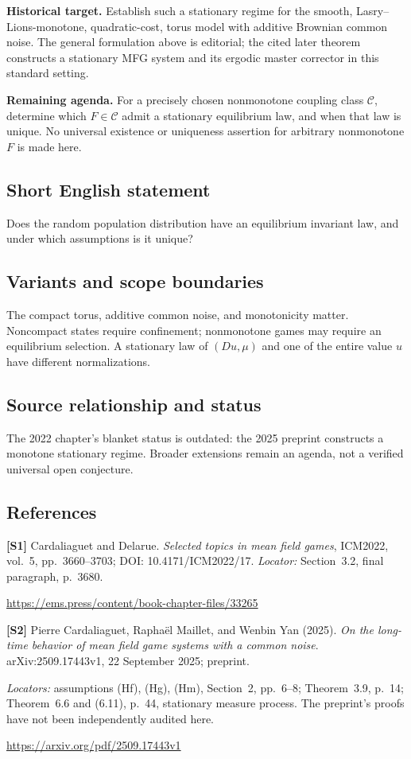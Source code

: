 \documentclass[11pt,a4paper]{article}
\begin{document}
\textbf{Historical target.} Establish such a stationary regime for the smooth, Lasry--Lions-monotone, quadratic-cost, torus model with additive Brownian common noise. The general formulation above is editorial; the cited later theorem constructs a stationary MFG system and its ergodic master corrector in this standard setting.

\textbf{Remaining agenda.} For a precisely chosen nonmonotone coupling class $\mathcal C$, determine which $F\in\mathcal C$ admit a stationary equilibrium law, and when that law is unique. No universal existence or uniqueness assertion for arbitrary nonmonotone $F$ is made here.
\subsection*{Short English statement}
Does the random population distribution have an equilibrium invariant law, and under which assumptions is it unique?
\subsection*{Variants and scope boundaries}
The compact torus, additive common noise, and monotonicity matter. Noncompact states require confinement; nonmonotone games may require an equilibrium selection. A stationary law of $(Du,\mu)$ and one of the entire value $u$ have different normalizations.
\subsection*{Source relationship and status}
The 2022 chapter's blanket status is outdated: the 2025 preprint constructs a monotone stationary regime. Broader extensions remain an agenda, not a verified universal open conjecture.
\subsection*{References}
\begingroup\footnotesize\raggedright
{\footnotesize\raggedright
\textbf{[S1]} Cardaliaguet and Delarue. \emph{Selected topics in mean field games}, ICM2022, vol.~5, pp.~3660--3703; DOI: 10.4171/ICM2022/17. \textit{Locator:} Section~3.2, final paragraph, p.~3680.\par
\url{https://ems.press/content/book-chapter-files/33265}\par\smallskip
\textbf{[S2]} Pierre Cardaliaguet, Rapha\"el Maillet, and Wenbin Yan (2025). \emph{On the long-time behavior of mean field game systems with a common noise}. arXiv:2509.17443v1, 22 September 2025; preprint.\par
\textit{Locators:} assumptions (Hf), (Hg), (Hm), Section~2, pp.~6--8; Theorem~3.9, p.~14; Theorem~6.6 and (6.11), p.~44, stationary measure process. The preprint's proofs have not been independently audited here.\par
\url{https://arxiv.org/pdf/2509.17443v1}\par}
\par\endgroup
\end{document}
